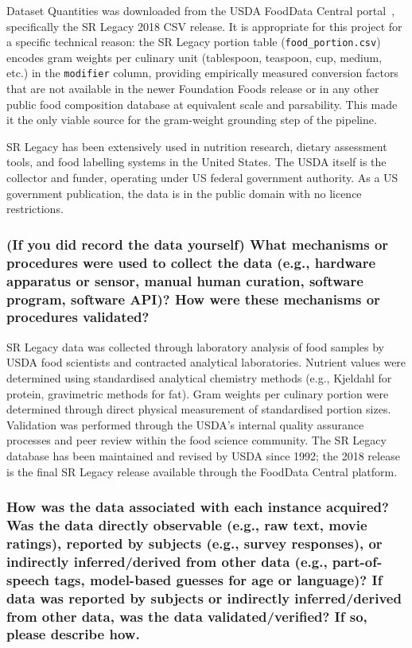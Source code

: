 \documentclass{article}
\newcommand{\question}[1]{#1}
\begin{document}
Dataset Quantities was downloaded from the USDA FoodData Central portal~\cite{usda_srlegacy}, specifically the SR Legacy 2018 CSV release. It is appropriate for this project for a specific technical reason: the SR Legacy portion table (\texttt{food\_portion.csv}) encodes gram weights per culinary unit (tablespoon, teaspoon, cup, medium, etc.) in the \texttt{modifier} column, providing empirically measured conversion factors that are not available in the newer Foundation Foods release or in any other public food composition database at equivalent scale and parsability. This made it the only viable source for the gram-weight grounding step of the pipeline.

SR Legacy has been extensively used in nutrition research, dietary assessment tools, and food labelling systems in the United States. The USDA itself is the collector and funder, operating under US federal government authority. As a US government publication, the data is in the public domain with no licence restrictions.

\question{\subsubsection*{(If you did record the data yourself) What mechanisms or procedures were used to collect the data (e.g., hardware apparatus or sensor, manual human curation, software program, software API)? How were these mechanisms or procedures validated?}}

SR Legacy data was collected through laboratory analysis of food samples by USDA food scientists and contracted analytical laboratories. Nutrient values were determined using standardised analytical chemistry methods (e.g., Kjeldahl for protein, gravimetric methods for fat). Gram weights per culinary portion were determined through direct physical measurement of standardised portion sizes. Validation was performed through the USDA's internal quality assurance processes and peer review within the food science community. The SR Legacy database has been maintained and revised by USDA since 1992; the 2018 release is the final SR Legacy release available through the FoodData Central platform.

\question{\subsubsection*{How was the data associated with each instance acquired? Was the data directly observable (e.g., raw text, movie ratings), reported by subjects (e.g., survey responses), or indirectly inferred/derived from other data (e.g., part-of-speech tags, model-based guesses for age or language)? If data was reported by subjects or indirectly inferred/derived from other data, was the data validated/verified? If so, please describe how.}}
\end{document}

